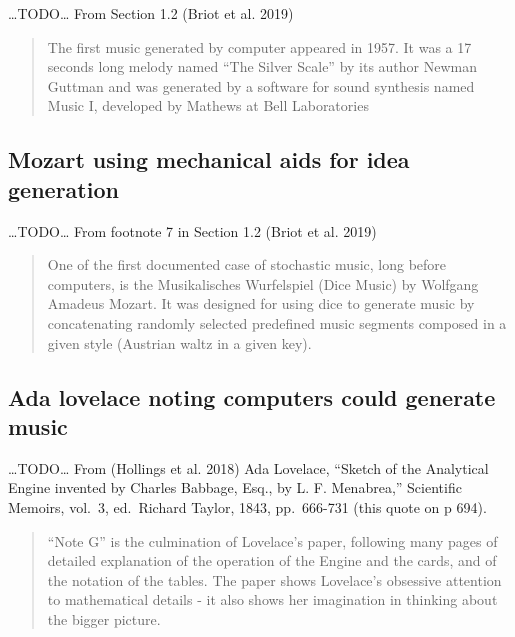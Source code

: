 \documentclass[12pt,a4paper,]{report}
\begin{document}
\ldots TODO\ldots{} From Section 1.2 (Briot et al. 2019)

\begin{quote}
The first music generated by computer appeared in 1957. It was a 17
seconds long melody named ``The Silver Scale'' by its author Newman
Guttman and was generated by a software for sound synthesis named Music
I, developed by Mathews at Bell Laboratories
\end{quote}

\hypertarget{mozart-using-mechanical-aids-for-idea-generation}{%
\subsection{Mozart using mechanical aids for idea
generation}\label{mozart-using-mechanical-aids-for-idea-generation}}

\ldots TODO\ldots{} From footnote 7 in Section 1.2 (Briot et al. 2019)

\begin{quote}
One of the first documented case of stochastic music, long before
computers, is the Musikalisches Wurfelspiel (Dice Music) by Wolfgang
Amadeus Mozart. It was designed for using dice to generate music by
concatenating randomly selected predefined music segments composed in a
given style (Austrian waltz in a given key).
\end{quote}

\hypertarget{ada-lovelace-noting-computers-could-generate-music}{%
\subsection{Ada lovelace noting computers could generate
music}\label{ada-lovelace-noting-computers-could-generate-music}}

\ldots TODO\ldots{} From (Hollings et al. 2018) Ada Lovelace, ``Sketch
of the Analytical Engine invented by Charles Babbage, Esq., by L. F.
Menabrea,'' Scientific Memoirs, vol.~3, ed.~Richard Taylor, 1843,
pp.~666-731 (this quote on p 694).

\begin{quote}
``Note G'' is the culmination of Lovelace's paper, following many pages
of detailed explanation of the operation of the Engine and the cards,
and of the notation of the tables. The paper shows Lovelace's obsessive
attention to mathematical details - it also shows her imagination in
thinking about the bigger picture.
\end{quote}
\end{document}
